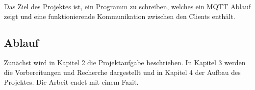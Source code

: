 Das Ziel des Projektes ist, ein Programm zu schreiben, welches ein MQTT Ablauf zeigt und eine funktionierende Kommunikation zwischen den Clients enthält.

\subsection{Ablauf}
Zunächst wird in Kapitel 2 die Projektaufgabe beschrieben. In Kapitel 3 werden die Vorbereitungen und Recherche dargestellt und in Kapitel 4 der Aufbau des Projektes. Die Arbeit endet mit einem Fazit. 






